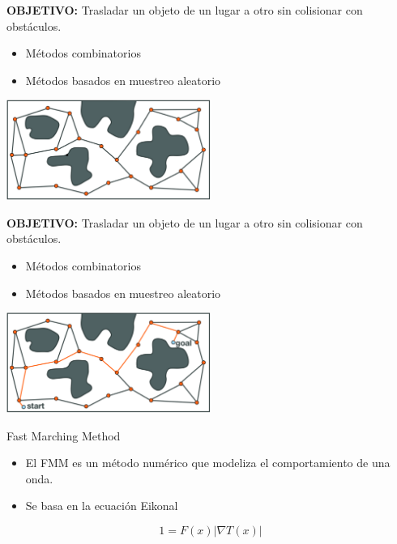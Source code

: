 \documentclass[10pt]{beamer}
\begin{document}
\begin{frame}\addtocounter{framenumber}{-1}
	\vspace{1.5cm}
	\textbf{OBJETIVO:} Trasladar un objeto de un lugar a otro sin colisionar con obstáculos.
	\begin{itemize}
		\item Métodos combinatorios		
		\item Métodos basados en muestreo aleatorio		
	\end{itemize}		
	\begin{center}
		\includegraphics[width=0.5\textwidth,keepaspectratio]{prm_2}
	\end{center}
	
\end{frame}

\begin{frame}\addtocounter{framenumber}{-1}
	\vspace{1.5cm}
	\textbf{OBJETIVO:} Trasladar un objeto de un lugar a otro sin colisionar con obstáculos.
	
	\begin{itemize}
		\item Métodos combinatorios		
		\item Métodos basados en muestreo aleatorio		
	\end{itemize}		
	\begin{center}
		\includegraphics[width=0.5\textwidth,keepaspectratio]{prm_3}
	\end{center}
	
\end{frame}

\begin{frame}{Fast Marching Method}
\begin{itemize}
	\item El FMM es un método numérico que modeliza el comportamiento de una onda.
	\item Se basa en la ecuación Eikonal
\end{itemize}

	\begin{equation}
	1=F(x)\left| \nabla T(x) \right| 
	\end{equation}
	
\end{frame}
\end{document}
